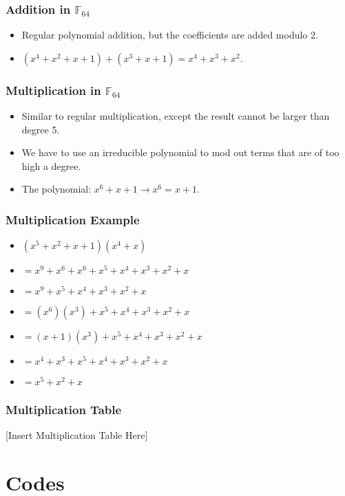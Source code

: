 \documentclass{beamer}
\begin{document}
\begin{frame}
	\frametitle{Addition in $\mathbb{F}_{64}$}
	\begin{itemize}
		\item Regular polynomial addition, but the coefficients are added modulo 2.
		\item $(x^{4} + x^{2} + x + 1) + (x^{3} + x + 1) = x^{4} + x^{3} + x^{2}$.
	\end{itemize}
\end{frame}

\begin{frame}
	\frametitle{Multiplication in $\mathbb{F}_{64}$}
	\begin{itemize}
		\item Similar to regular multiplication, except the result cannot be larger than degree 5.
		\item We have to use an irreducible polynomial to mod out terms that are of too high a degree.
		\item The polynomial: $x^{6} + x + 1 \rightarrow x^{6} = x + 1$.
	\end{itemize}
\end{frame}

\begin{frame}
	\frametitle{Multiplication Example}
	\begin{itemize}
		\item $(x^{5} + x^{2} + x + 1)(x^{4} + x)$
		\item $= x^{9} + x^{6} + x^{6} + x^{5} + x^{4} + x^{3} + x^{2} + x$
		\item $= x^{9} + x^{5} + x^{4} + x^{3} + x^{2} + x$
		\item $= (x^{6})(x^{3}) + x^{5} + x^{4} + x^{3} + x^{2} + x$
		\item $= (x + 1)(x^{3}) + x^{5} + x^{4} + x^{3} + x^{2} + x$
		\item $= x^{4} + x^{3} + x^{5} + x^{4} + x^{3} + x^{2} + x$
		\item $= x^{5} + x^{2} + x$
	\end{itemize}
\end{frame}

\begin{frame}
	\frametitle{Multiplication Table}
	[Insert Multiplication Table Here]
\end{frame}

\section{Codes}
\end{document}
